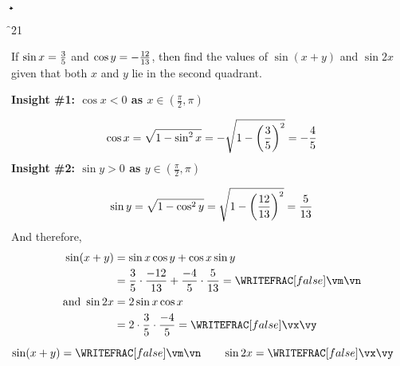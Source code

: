 

\FRACMULT\va\vc{-\ve}\vf\a\b
\FRACMULT\vd\vf{-\vb}\vc\c\d
\FRACADD\a\b\c\d\vm\vn

\FRACMULT\va\vc{-\vb}\vc\e\f
\FRACMULT\e\f{2}{1}\vx\vy

\question[4] If $\sin x= \frac{3}{5}$ and $\cos y = -\frac{12}{13}$, then find the values 
of $\sin(x+y)$ and $\sin 2x$ given that both $x$ and $y$ lie in the second quadrant.

\watchout

\begin{solution}[\halfpage]
  \textbf{Insight \#1: $\cos x < 0$ as $x\in\left(\frac\pi{2},\pi\right)$ }
  
  \[ \cos x = \sqrt{1-\sin^2 x} = -\sqrt{1-\left(\dfrac{3}{5}\right)^2} = -\dfrac{4}{5} \]
  \textbf{Insight \#2: $\sin y > 0$ as $y\in\left(\frac\pi{2},\pi\right)$ }

  \[ \sin y = \sqrt{1-\cos^2 y} = \sqrt{1-\left(\dfrac{12}{13}\right)^2} = \dfrac{5}{13} \]
  And therefore, 
  \begin{align}
    \sin(x+y) &= \sin x\cos y + \cos x\sin y \nonumber \\ 
    &= \dfrac\va\vc\cdot\dfrac{-\ve}\vf + \dfrac{-\vb}\vc\cdot\dfrac\vd\vf = \WRITEFRAC[false]\vm\vn \\
    \text{and }\sin 2x &= 2\sin x\cos x \nonumber\\
    &= 2\cdot\dfrac\va\vc\cdot\dfrac{-\vb}\vc =\WRITEFRAC[false]\vx\vy
  \end{align}
\end{solution}

\ifprintanswers
  \begin{codex}
    $\sin (x+y) = \WRITEFRAC[false]\vm\vn\qquad\sin 2x=\WRITEFRAC[false]\vx\vy$
  \end{codex}
\fi

